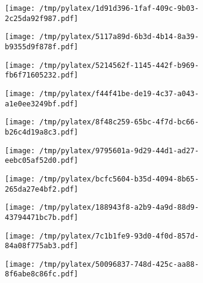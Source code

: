 \documentclass{article}
\begin{document}
\begin{figure}[htbp]
\begin{subfigure}[b]{.3\linewidth}
\texttt{[image: /tmp/pylatex/1d91d396-1faf-409c-9b03-2c25da92f987.pdf]}
\end{subfigure}
\begin{subfigure}[b]{.3\linewidth}
\texttt{[image: /tmp/pylatex/5117a89d-6b3d-4b14-8a39-b9355d9f878f.pdf]}
\end{subfigure}
\begin{subfigure}[b]{.3\linewidth}
\texttt{[image: /tmp/pylatex/5214562f-1145-442f-b969-fb6f71605232.pdf]}
\end{subfigure}
\begin{subfigure}[b]{.3\linewidth}
\texttt{[image: /tmp/pylatex/f44f41be-de19-4c37-a043-a1e0ee3249bf.pdf]}
\end{subfigure}
\begin{subfigure}[b]{.3\linewidth}
\texttt{[image: /tmp/pylatex/8f48c259-65bc-4f7d-bc66-b26c4d19a8c3.pdf]}
\end{subfigure}
\begin{subfigure}[b]{.3\linewidth}
\texttt{[image: /tmp/pylatex/9795601a-9d29-44d1-ad27-eebc05af52d0.pdf]}
\end{subfigure}
\begin{subfigure}[b]{.3\linewidth}
\texttt{[image: /tmp/pylatex/bcfc5604-b35d-4094-8b65-265da27e4bf2.pdf]}
\end{subfigure}
\begin{subfigure}[b]{.3\linewidth}
\texttt{[image: /tmp/pylatex/188943f8-a2b9-4a9d-88d9-43794471bc7b.pdf]}
\end{subfigure}
\begin{subfigure}[b]{.3\linewidth}
\texttt{[image: /tmp/pylatex/7c1b1fe9-93d0-4f0d-857d-84a08f775ab3.pdf]}
\end{subfigure}
\begin{subfigure}[b]{.3\linewidth}
\texttt{[image: /tmp/pylatex/50096837-748d-425c-aa88-8f6abe8c86fc.pdf]}
\end{subfigure}
\end{figure}
\end{document}
